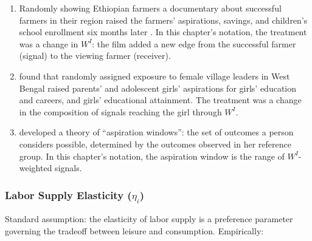 \documentclass[../structural_economics_book.tex]{subfiles}
\begin{document}
\begin{stylizedfact}\label{ch09:prop:aspiration}
\leavevmode
\begin{enumerate}
\item Randomly showing Ethiopian farmers a documentary about successful farmers in their region raised the farmers' aspirations, savings, and children's school enrollment six months later \citep{bernard2014future}. In this chapter's notation, the treatment was a change in $W^I$: the film added a new edge from the successful farmer (signal) to the viewing farmer (receiver).
\item \citet[\textit{Science}]{beaman2012female} found that randomly assigned exposure to female village leaders in West Bengal raised parents' and adolescent girls' aspirations for girls' education and careers, and girls' educational attainment. The treatment was a change in the composition of signals reaching the girl through $W^I$.
\item \citet{ray2006aspirations} developed a theory of ``aspiration windows'': the set of outcomes a person considers possible, determined by the outcomes observed in her reference group. In this chapter's notation, the aspiration window is the range of $W^I$-weighted signals.
\end{enumerate}
\end{stylizedfact}


\subsubsection{Labor Supply Elasticity ($\eta_i$)}

Standard assumption: the elasticity of labor supply is a preference parameter governing the tradeoff between leisure and consumption. Empirically:
\end{document}
